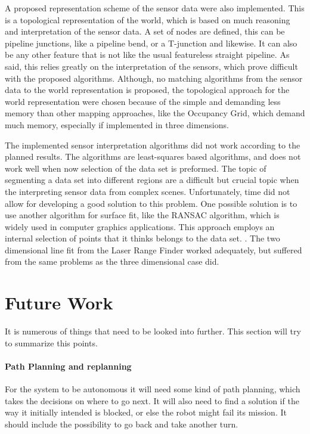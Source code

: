 A proposed representation scheme of the sensor data were also implemented. This is a
topological representation of the world, which is based on much reasoning and
interpretation of the sensor data. A set of nodes are defined, this can be pipeline
junctions, like a pipeline bend, or a T-junction and likewise. It can also be any other
feature that is not like the usual featureless straight pipeline. As said, this relies
greatly on the interpretation of the sensors, which prove difficult with the proposed
algorithms. Although, no matching algorithms from the sensor data to the world
representation is proposed, the topological approach for the world representation were
chosen because of the simple and demanding less memory than other mapping approaches, like
the Occupancy Grid, which demand much memory, especially if implemented in three
dimensions. 

The implemented sensor interpretation algorithms did not work according to the planned
results. The algorithms are least-squares based algorithms, and does not work well when
now selection of the data set is preformed. The topic of segmenting a data set into
different regions are a difficult but crucial topic when the interpreting sensor data from
complex scenes. Unfortunately, time did not allow for developing a good solution to this
problem. One possible solution is to use another algorithm for surface fit, like the
RANSAC algorithm, which is widely used in computer graphics applications. This approach
employs an internal selection of points that it thinks belongs to the data set.
\cite{ransac}. The two dimensional line fit from the Laser Range Finder worked adequately,
but suffered from the same problems as the three dimensional case did. 



\section{Future Work}
It is numerous of things that need to be looked into further. This section will try to 
summarize this points. 

\paragraph{Path Planning and replanning} For the system to be autonomous it will
need some kind of path planning, which takes the decisions on where to go next. It will
also need to find a solution if the way it initially intended is blocked, or else the
robot might fail its mission. It should include the possibility to go back and take
another turn. 

